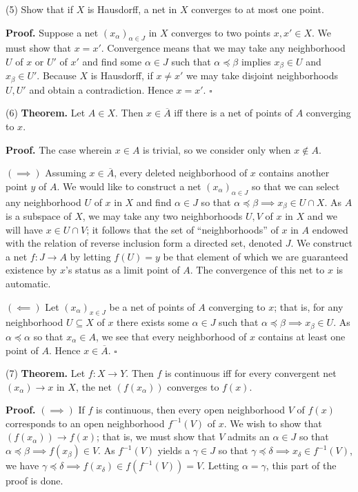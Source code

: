 \documentclass[a4paper]{article}
\begin{document}
(5) Show that if $X$ is Hausdorff, a net in $X$ converges to at most one point.

\textbf{Proof.} Suppose a net $(x_\alpha)_{\alpha \in J}$ in $X$ converges to two points $x, x' \in X$. We must show that $x = x'$. Convergence means that we may take any neighborhood $U$ of $x$ or $U'$ of $x'$ and find some $\alpha \in J$ such that $\alpha \preceq \beta$ implies $x_\beta \in U$ and $x_\beta \in U'$. Because $X$ is Hausdorff, if $x \neq x'$ we may take disjoint neighborhoods $U, U'$ and obtain a contradiction. Hence $x = x'$. $\square$

\vspace{0.5cm}

(6) \textbf{Theorem.} Let $A \in X$. Then $x \in \overline{A}$ iff there is a net of points of $A$ converging to $x$.

\textbf{Proof.} The case wherein $x \in A$ is trivial, so we consider only when $x \notin A$.

$(\implies)$ Assuming $x \in \overline{A}$, every deleted neighborhood of $x$ contains another point $y$ of $A$. We would like to construct a net $(x_\alpha)_{\alpha \in J}$ so that we can select any neighborhood $U$ of $x$ in $X$ and find $\alpha \in J$ so that $\alpha \preceq \beta \implies x_\beta \in U \cap X$. As $A$ is a subspace of $X$, we may take any two neighborhoods $U, V$ of $x$ in $X$ and we will have $x \in U \cap V$; it follows that the set of ``neighborhoods'' of $x$ in $A$ endowed with the relation of reverse inclusion form a directed set, denoted $J$. We construct a net $f : J \to A$ by letting $f(U) = y$ be that element of which we are guaranteed existence by $x$'s status as a limit point of $A$. The convergence of this net to $x$ is automatic.

$(\impliedby)$ Let $(x_\alpha)_{x \in J}$ be a net of points of $A$ converging to $x$; that is, for any neighborhood $U \subseteq X$ of $x$ there exists some $\alpha \in J$ such that $\alpha \preceq \beta \implies x_\beta \in U$. As $\alpha \preceq \alpha$ so that $x_\alpha \in A$, we see that every neighborhood of $x$ contains at least one point of $A$. Hence $x \in \overline{A}$. $\square$

\vspace{0.5cm}

(7) \textbf{Theorem.} Let $f : X \to Y$. Then $f$ is continuous iff for every convergent net $(x_\alpha) \to x$ in $X$, the net $(f(x_\alpha))$ converges to $f(x)$.

\textbf{Proof.} $(\implies)$ If $f$ is continuous, then every open neighborhood $V$ of $f(x)$ corresponds to an open neighborhood $f^{-1}(V)$ of $x$. We wish to show that $(f(x_\alpha)) \to f(x)$; that is, we must show that $V$ admits an $\alpha \in J$ so that $\alpha \preceq \beta \implies f(x_\beta) \in V$. As $f^{-1}(V)$ yields a $\gamma \in J$ so that $\gamma \preceq \delta \implies x_\delta \in f^{-1}(V)$, we have $\gamma \preceq \delta \implies f(x_\delta) \in f(f^{-1}(V)) = V$. Letting $\alpha = \gamma$, this part of the proof is done.
\end{document}

